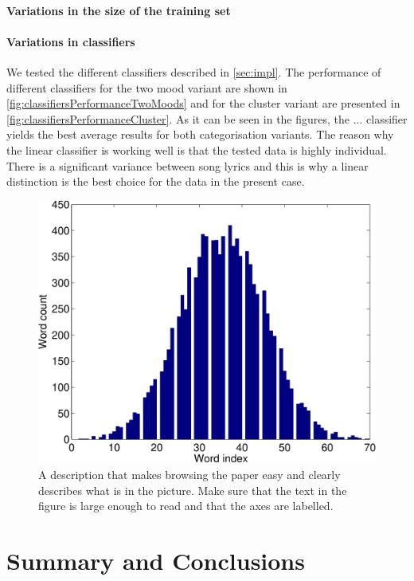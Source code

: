 \documentclass[a4paper,12pt]{article}
\begin{document}
\paragraph{Variations in the size of the training set} 

\paragraph{Variations in classifiers} We tested the different classifiers described in \ref{sec:impl}. The performance of different classifiers for the two mood variant are shown in \ref{fig:classifiersPerformanceTwoMoods} and for the cluster variant are presented in \ref{fig:classifiersPerformanceCluster}. As it can be seen in the figures, the ... classifier yields the best average results for both categorisation variants. The reason why the linear classifier is working well is that the tested data is highly individual. There is a significant variance between song lyrics and this is why a linear distinction is the best choice for the data in the present case.

 

\begin{figure}
\centering
\includegraphics[width=0.8\linewidth]{histogram}
\caption{A description that makes browsing the paper easy and clearly 
describes what is in the picture. Make sure that the text in the figure 
is large enough to read and that the axes are labelled.}
\label{fig:histogram}
\end{figure}
 

\section{Summary and Conclusions}
\label{sec:summary}
\end{document}
